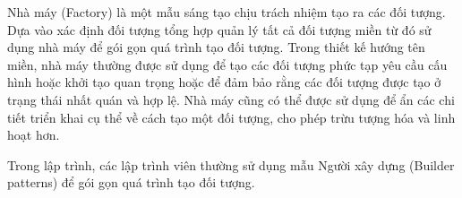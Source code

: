 Nhà máy (Factory) là một mẫu sáng tạo chịu trách nhiệm tạo ra các đối tượng. Dựa vào xác định đối tượng tổng hợp quản lý tất cả đối tượng miền từ đó sử dụng nhà máy để gói gọn quá trình tạo đối tượng. Trong thiết kế hướng tên miền, nhà máy thường được sử dụng để tạo các đối tượng phức tạp yêu cầu cấu hình hoặc khởi tạo quan trọng hoặc để đảm bảo rằng các đối tượng được tạo ở trạng thái nhất quán và hợp lệ. Nhà máy cũng có thể được sử dụng để ẩn các chi tiết triển khai cụ thể về cách tạo một đối tượng, cho phép trừu tượng hóa và linh hoạt hơn.

\begin{example} Trong lập trình, các lập trình viên thường sử dụng mẫu Người xây dựng (Builder patterns) để gói gọn quá trình tạo đối tượng.

\end{example}







